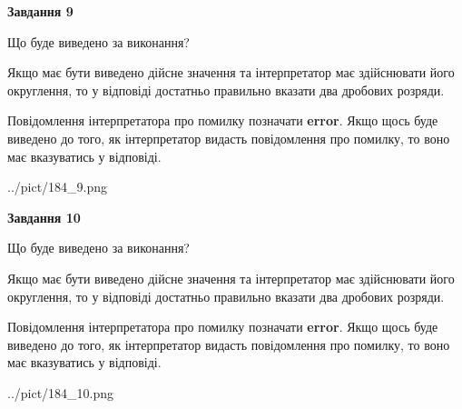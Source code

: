 \documentclass[12pt, ukrainian]{article}
\begin{document}
{\begin {Large}
{\begin {center}\textbf{Завдання 9}\end {center}}\par
Що буде виведено за виконання? \par

Якщо має бути виведено дійсне значення та інтерпретатор має здійснювати його округлення, 
то у відповіді достатньо правильно вказати два дробових розряди.

Повідомлення інтерпретатора про помилку позначати \textbf{error}.
Якщо щось буде виведено до того, як інтерпретатор видасть повідомлення про помилку, 
то воно має вказуватись у відповіді. \par

\begin{center}
	{../pict/184_9.png}
\end{center}
\newpage

{\begin {center}\textbf{Завдання 10}\end {center}}\par
Що буде виведено за виконання? \par

Якщо має бути виведено дійсне значення та інтерпретатор має здійснювати його округлення, 
то у відповіді достатньо правильно вказати два дробових розряди.

Повідомлення інтерпретатора про помилку позначати \textbf{error}.
Якщо щось буде виведено до того, як інтерпретатор видасть повідомлення про помилку, 
то воно має вказуватись у відповіді. \par

\begin{center}
	{../pict/184_10.png}
\end{center}
\newpage

\end {Large}}
\end{document}
